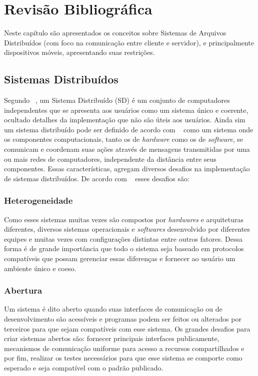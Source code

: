 
\chapter{Revisão Bibliográfica}
\label{cap2}

Neste capítulo são apresentados os conceitos sobre Sistemas de Arquivos Distribuídos (com foco na comunicação entre cliente e servidor), e principalmente dispositivos móveis, apresentando suas restrições.


\section{Sistemas Distribuídos}

    Segundo ~\cite{tanenbaum}, um Sistema Distribuído (SD) é um conjunto de computadores independentes que se apresenta aos usuários como um sistema único e coerente, ocultado detalhes da implementação que não são úteis aos usuários. Ainda sim um sistema distribuído pode ser definido de acordo com ~\cite{coulouris} como um sistema onde os componentes computacionais, tanto os de \textit{hardware} como os de \textit{software}, se comunicam e coordenam suas ações através de mensagens transmitidas por uma ou mais redes de computadores, independente da distância entre seus componentes. Essas características, agregam diversos desafios na implementação de sistemas distribuídos. De acordo com ~\cite{coulouris} esses desafios são:
    
    \subsection{Heterogeneidade}
        Como esses sistemas muitas vezes são compostos por \textit{hardwares} e arquiteturas diferentes, diversos sistemas operacionais e \textit{softwares} desenvolvido por diferentes equipes e muitas vezes com configurações distintas entre outros fatores. Dessa forma é de grande importância que todo o sistema seja baseado em protocolos compatíveis que possam gerenciar essas diferenças e fornecer ao usuário um ambiente único e coeso.
    
    \subsection{Abertura}
        Um sistema é dito aberto quando suas interfaces de comunicação ou de desenvolvimento são acessíveis e programas podem ser feitos ou alterados por terceiros para que sejam compatíveis com esse sistema. Os grandes desafios para criar sistemas abertos são: fornecer principais interfaces publicamente, mecanismos de comunicação uniforme para acesso a recursos compartilhados e por fim, realizar os testes necessários para que esse sistema se comporte como esperado e seja compatível com o padrão publicado.
    
